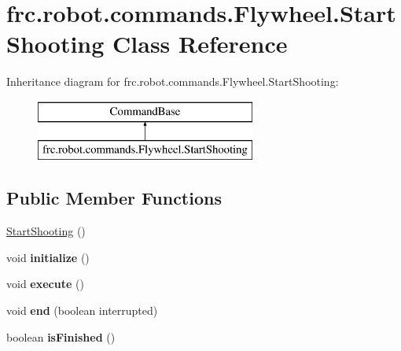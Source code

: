 \hypertarget{classfrc_1_1robot_1_1commands_1_1_flywheel_1_1_start_shooting}{}\section{frc.\+robot.\+commands.\+Flywheel.\+Start\+Shooting Class Reference}
\label{classfrc_1_1robot_1_1commands_1_1_flywheel_1_1_start_shooting}
Inheritance diagram for frc.\+robot.\+commands.\+Flywheel.\+Start\+Shooting\+:\begin{figure}[H]
\begin{center}
\leavevmode
\includegraphics[height=2.000000cm]{classfrc_1_1robot_1_1commands_1_1_flywheel_1_1_start_shooting}
\end{center}
\end{figure}
\subsection*{Public Member Functions}
\begin{DoxyCompactItemize}
\item 
\mbox{\hyperlink{classfrc_1_1robot_1_1commands_1_1_flywheel_1_1_start_shooting_ae5b4d82a05f7e96e608972ddb793c1aa}{Start\+Shooting}} ()
\item 
\mbox{\label{classfrc_1_1robot_1_1commands_1_1_flywheel_1_1_start_shooting_a7166383f6e05b2bc5b78e093c20c9958}} 
void {\bfseries initialize} ()
\item 
\mbox{\label{classfrc_1_1robot_1_1commands_1_1_flywheel_1_1_start_shooting_a5e528e58c5459b5671dee8adc8878906}} 
void {\bfseries execute} ()
\item 
\mbox{\label{classfrc_1_1robot_1_1commands_1_1_flywheel_1_1_start_shooting_a4759618af0994db801fa80852e937cb7}} 
void {\bfseries end} (boolean interrupted)
\item 
\mbox{\label{classfrc_1_1robot_1_1commands_1_1_flywheel_1_1_start_shooting_a1587e7115c0e0a84a704b3431bd6ed21}} 
boolean {\bfseries is\+Finished} ()
\end{DoxyCompactItemize}


